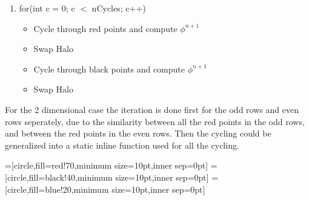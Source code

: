 		\begin{enumerate}
			\item for(int c = 0; c \(<\) nCycles; c++)
				\begin{itemize}
					\item Cycle through red points and compute \(\phi^{n+1}\)
					\item Swap Halo
					\item Cycle through black points and compute \(\phi^{n+1}\)
					\item Swap Halo
				\end{itemize}
		\end{enumerate}

		For the 2 dimensional case the iteration is done first for the odd rows and even rows seperately, due
		to the similarity between all the red points in the odd rows, and between the red points in the even rows.
		Then the cycling could be generalized into a static inline function used for all the cycling.

		=[circle,fill=red!70,minimum size=10pt,inner sep=0pt]
		=[circle,fill=black!40,minimum size=10pt,inner sep=0pt]
		=[circle,fill=blue!20,minimum size=10pt,inner sep=0pt]

